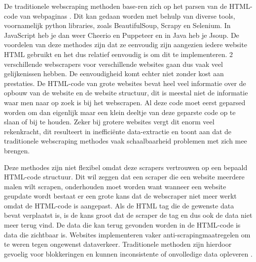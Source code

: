 De traditionele webscraping methoden base-ren zich op het parsen van de HTML-code van webpaginas \autocite{sirisuriya}. Dit kan gedaan
worden met behulp van diverse tools, voornamelijk python libraries, zoals BeautifulSoup, Scrapy en
Selenium. In JavaScript heb je dan weer Cheerio en Puppeteer en in Java heb je Jsoup. De voordelen van deze methodes zijn dat ze eenvoudig zijn aangezien iedere website HTML gebruikt en
het dus relatief eenvoudig is om dit te implementeren. 2 verschillende webscrapers voor verschillende websites gaan dus vaak veel gelijkenissen hebben. De eenvoudigheid komt echter niet zonder kost aan prestaties. De HTML-code van grote websites bevat heel veel informatie over de opbouw van de website en de website structuur, dit is meestal niet de informatie waar men naar op
zoek is bij het webscrapen. Al deze code moet eerst geparsed worden om dan eigenlijk maar
een klein deeltje van deze geparste code op te
slaan of bij te houden. Zeker bij grotere websites vergt dit enorm veel rekenkracht, dit resulteert
in inefficiënte data-extractie en toont aan dat de
traditionele webscraping methodes vaak schaalbaarheid problemen met zich mee brengen.

\vspace{5mm} %

Deze methodes zijn niet flexibel omdat deze scrapers vertrouwen op een bepaald HTML-code structuur. Dit wil zeggen dat een scraper die een website meerdere malen wilt scrapen, onderhouden
moet worden want wanneer een website geupdate wordt bestaat er een grote kans dat de webscraper niet meer werkt omdat de HTML-code is
aangepast. Als de HTML tag die de gewenste data
bevat verplaatst is, is de kans groot dat de scraper de tag en dus ook de data niet meer terug vind. De data die kan terug gevonden worden in de HTML-code is data die zichtbaar is. Websites implementeren vaker anti-scrapingmaatregelen om te weren tegen ongewenst dataverkeer. Traditionele methoden zijn hierdoor gevoelig voor blokkeringen en kunnen inconsistente of onvolledige data opleveren \autocite{Sandeep & Satam, 2022}.
